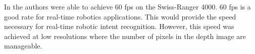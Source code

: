 \documentclass[conference]{IEEEtran}
\begin{document}
In \cite{Baak2011} the authors were able to achieve 60 fps on the Swiss-Ranger 4000. 60 fps is a good rate for real-time robotics applications. This would provide the speed necessary for real-time robotic intent recognition. However, this speed was achieved at low resolutions where the number of pixels in the depth image are manageable.
%
%



%
%
\end{document}

